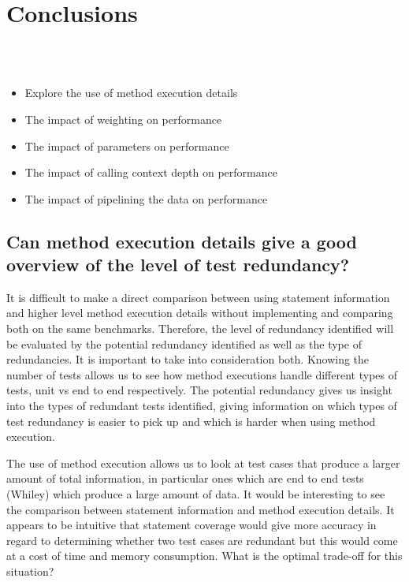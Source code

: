 \section{Conclusions}

 \\
 \\


\begin{itemize}
\item{Explore the use of method execution details}
\item{The impact of weighting on performance}
\item{The impact of parameters on performance}
\item{The impact of calling context depth on performance}
\item{The impact of pipelining the data on performance}
\end{itemize}

\subsection{Can method execution details give a good overview of the level of test redundancy?}

It is difficult to make a direct comparison between using statement information and higher level method execution details without implementing and comparing both on the same benchmarks. Therefore, the level of redundancy identified will be evaluated by the potential redundancy identified as well as the type of redundancies. It is important to take into consideration both. Knowing the number of tests allows us to see how method executions handle different types of tests, unit vs end to end respectively. The potential redundancy gives us insight into the types of redundant tests identified, giving information on which types of test redundancy is easier to pick up and which is harder when using method execution.

The use of method execution allows us to look at test cases that produce a larger amount of total information, in particular ones which are end to end tests (Whiley) which produce a large amount of data. It would be interesting to see the comparison between statement information and method execution details. It appears to be intuitive that statement coverage would give more accuracy in regard to determining whether two test cases are redundant but this would come at a cost of time and memory consumption. What is the optimal trade-off for this situation? 

